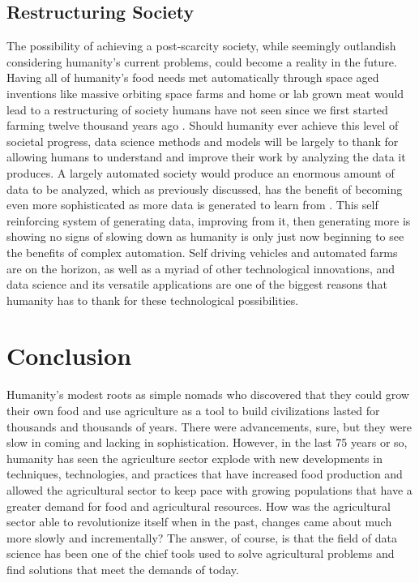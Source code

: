 \documentclass[sigconf]{acmart}
\begin{document}
\subsection{Restructuring Society}

The possibility of achieving a post-scarcity society, while seemingly outlandish considering humanity's current problems, could become a reality in the future. Having all of humanity's food needs met automatically through space aged inventions like massive orbiting space farms and home or lab grown meat would lead to a restructuring of society humans have not seen since we first started farming twelve thousand years ago \cite{david2017}. Should humanity ever achieve this level of societal progress, data science methods and models will be largely to thank for allowing humans to understand and improve their work by analyzing the data it produces. A largely automated society would produce an enormous amount of data to be analyzed, which as previously discussed, has the benefit of becoming even more sophisticated as more data is generated to learn from \cite{biem2015}. This self reinforcing system of generating data, improving from it, then generating more is showing no signs of slowing down as humanity is only just now beginning to see the benefits of complex automation. Self driving vehicles and automated farms are on the horizon, as well as a myriad of other technological innovations, and data science and its versatile applications are one of the biggest reasons that humanity has to thank for these technological possibilities.

\section{Conclusion}

Humanity's modest roots as simple nomads who discovered that they could grow their own food and use agriculture as a tool to build civilizations lasted for thousands and thousands of years. There were advancements, sure, but they were slow in coming and lacking in sophistication. However, in the last 75 years or so, humanity has seen the agriculture sector explode with new developments in techniques, technologies, and practices that have increased food production and allowed the agricultural sector to keep pace with growing populations that have a greater demand for food and agricultural resources. How was the agricultural sector able to revolutionize itself when in the past, changes came about much more slowly and incrementally? The answer, of course, is that the field of data science has been one of the chief tools used to solve agricultural problems and find solutions that meet the demands of today.
\end{document}
